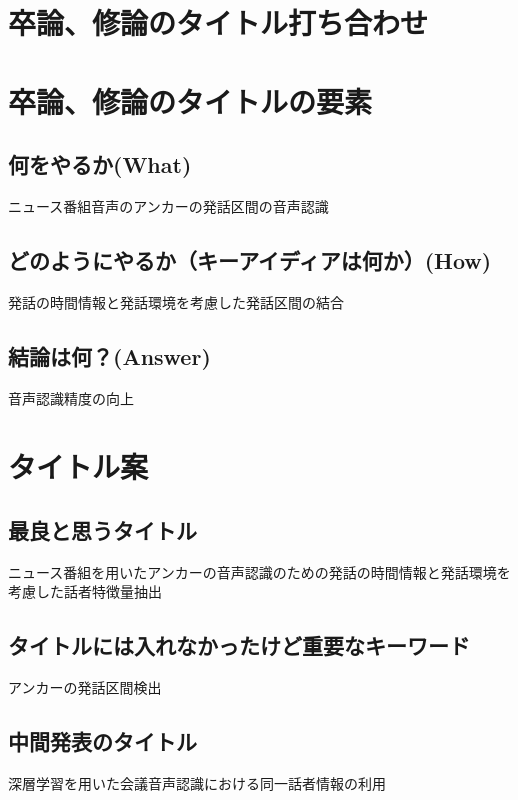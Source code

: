 \documentclass[11pt,a4paper]{jsarticle}
\begin{document}
%
%
\section*{卒論、修論のタイトル打ち合わせ}
\section{卒論、修論のタイトルの要素}
\subsection{何をやるか(What)}
ニュース番組音声のアンカーの発話区間の音声認識

\subsection{どのようにやるか（キーアイディアは何か）(How)}
発話の時間情報と発話環境を考慮した発話区間の結合

\subsection{結論は何？(Answer)}
音声認識精度の向上

\section{タイトル案}

\subsection{最良と思うタイトル}
ニュース番組を用いたアンカーの音声認識のための発話の時間情報と発話環境を考慮した話者特徴量抽出

\subsection{タイトルには入れなかったけど重要なキーワード}
アンカーの発話区間検出

\subsection{中間発表のタイトル}
深層学習を用いた会議音声認識における同一話者情報の利用

%
%
\end{document}
